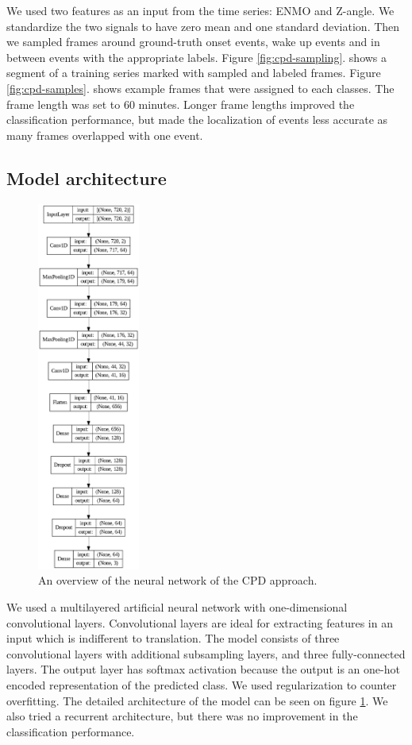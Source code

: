 \documentclass{article}
\begin{document}
We used two features as an input from the time series: ENMO and Z-angle. We standardize the two signals to have zero mean and one standard deviation. Then we sampled frames around ground-truth onset events, wake up events and in between events with the appropriate labels. Figure \ref{fig:cpd-sampling}. shows a segment of a training series marked with sampled and labeled frames. Figure \ref{fig:cpd-samples}. shows example frames that were assigned to each classes. The frame length was set to 60 minutes. Longer frame lengths improved the classification performance, but made the localization of events less accurate as many frames overlapped with one event.

\subsection{Model architecture}

\begin{figure}
  \label{fig:model-cpd}
  \includegraphics[width=0.3\textwidth]{cpd_model_plot.png}
  \caption{An overview of the neural network of the CPD approach.}
\end{figure}

We used a multilayered artificial neural network with one-dimensional convolutional layers. Convolutional layers are ideal for extracting features in an input which is indifferent to translation. The model consists of three convolutional layers with additional subsampling layers, and three fully-connected layers. The output layer has softmax activation because the output is an one-hot encoded representation of the predicted class. We used regularization to counter overfitting. The detailed architecture of the model can be seen on figure \ref{fig:model-cpd}.
We also tried a recurrent architecture, but there was no improvement in the classification performance.
\end{document}
